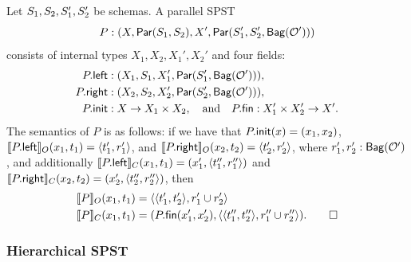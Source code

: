 \begin{definition}
Let $\ss_1, \ss_2, \ss_1', \ss_2'$ be schemas.
A parallel SPST
\[
P : (X, \parcomp{\ss_1}{\ss_2}, X', \parthree{\ss_1'}{\ss_2'}{\relleaf{\mathcal{O}'}})
\]
consists of internal types $X_1, X_2, X_1', X_2'$ and
four fields:
\begin{align*}
\spstfield{P}{left} &: (X_1, \ss_1, X_1', \parcomp{\ss_1'}{\relleaf{\mathcal{O}'}}), \\
\spstfield{P}{right} &: (X_2, \ss_2, X_2', \parcomp{\ss_2'}{\relleaf{\mathcal{O}'}}), \\
\spstfield{P}{init} &: X \to X_1 \times X_2,
\quad \text{and} \quad
\spstfield{P}{fin} : X_1' \times X_2' \to X'.
\end{align*}
The semantics of $P$ is as follows: if we have that
$\spstfield{P}{init}(x) = (x_1, x_2)$,
$\spstsemO{x_1}{t_1}{\spstfield{P}{left}} = \spspar{t_1'}{r_1'}$,
and
$\spstsemO{x_2}{t_2}{\spstfield{P}{right}} = \spspar{t_2'}{r_2'}$,
where $r_1', r_2': \relleaf{\mathcal{O}'}$,
and
additionally $\spstsemC{x_1}{t_1}{\spstfield{P}{left}} = (x_1', \spspar{t_1''}{r_1''})$
and
$\spstsemC{x_2}{t_2}{\spstfield{P}{right}} = (x_2', \spspar{t_2''}{r_2''})$,
then
\begin{align*}
\spstsemO{x_1}{t_1}{P}
    &= \spspar{\spspar{t_1'}{t_2'}}{r_1' \cup r_2'} \\
\spstsemC{x_1}{t_1}{P}
    &= ( \spstfield{P}{fin}(x_1', x_2'),
         \spspar{\spspar{t_1''}{t_2''}}{r_1'' \cup r_2''} ).
    \qed
\end{align*}
\end{definition}

\subsubsection{Hierarchical SPST}

